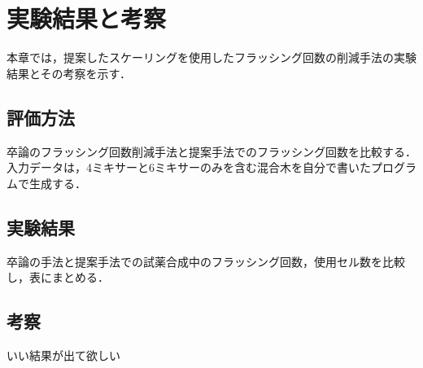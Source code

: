\chapter{実験結果と考察}
本章では，提案したスケーリングを使用したフラッシング回数の削減手法の実験結果とその考察を示す．

\section{評価方法}
卒論のフラッシング回数削減手法と提案手法でのフラッシング回数を比較する．入力データは，4ミキサーと6ミキサーのみを含む混合木を自分で書いたプログラムで生成する．

\section{実験結果}
卒論の手法と提案手法での試薬合成中のフラッシング回数，使用セル数を比較し，表にまとめる．


\section{考察}
いい結果が出て欲しい
